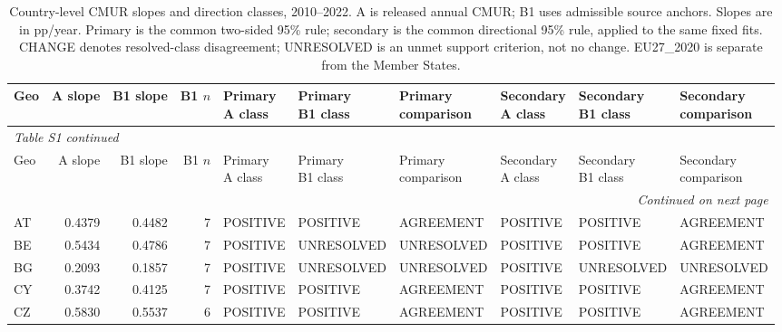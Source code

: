 \begingroup
\scriptsize
\setlength{\tabcolsep}{3pt}
\setlength{\LTcapwidth}{\linewidth}
\renewcommand{\arraystretch}{1.1}
\begin{longtable}{lrrrllllll}
\caption{Country-level CMUR slopes and direction classes, 2010--2022. A is released annual CMUR; B1 uses admissible source anchors. Slopes are in pp/year. Primary is the common two-sided 95\% rule; secondary is the common directional 95\% rule, applied to the same fixed fits. CHANGE denotes resolved-class disagreement; UNRESOLVED is an unmet support criterion, not no change. EU27\_2020 is separate from the Member States.}\label{tab:S1} \\
\toprule
Geo & A slope & B1 slope & B1 $n$ & \shortstack{Primary\\A class} & \shortstack{Primary\\B1 class} & \shortstack{Primary\\comparison} & \shortstack{Secondary\\A class} & \shortstack{Secondary\\B1 class} & \shortstack{Secondary\\comparison} \\
\midrule
\endfirsthead
\multicolumn{10}{l}{\textit{Table S1 continued}} \\
\toprule
Geo & A slope & B1 slope & B1 $n$ & \shortstack{Primary\\A class} & \shortstack{Primary\\B1 class} & \shortstack{Primary\\comparison} & \shortstack{Secondary\\A class} & \shortstack{Secondary\\B1 class} & \shortstack{Secondary\\comparison} \\
\midrule
\endhead
\midrule
\multicolumn{10}{r}{\textit{Continued on next page}} \\
\endfoot
\bottomrule
\endlastfoot
AT & 0.4379 & 0.4482 & 7 & POSITIVE & POSITIVE & AGREEMENT & POSITIVE & POSITIVE & AGREEMENT \\
BE & 0.5434 & 0.4786 & 7 & POSITIVE & UNRESOLVED & UNRESOLVED & POSITIVE & POSITIVE & AGREEMENT \\
BG & 0.2093 & 0.1857 & 7 & POSITIVE & UNRESOLVED & UNRESOLVED & POSITIVE & UNRESOLVED & UNRESOLVED \\
CY & 0.3742 & 0.4125 & 7 & POSITIVE & POSITIVE & AGREEMENT & POSITIVE & POSITIVE & AGREEMENT \\
CZ & 0.5830 & 0.5537 & 6 & POSITIVE & POSITIVE & AGREEMENT & POSITIVE & POSITIVE & AGREEMENT \\

\end{longtable}
